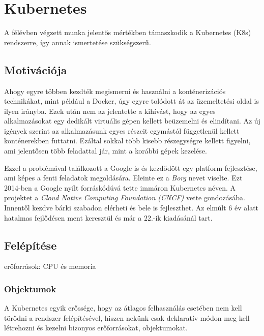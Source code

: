 \chapter{Kubernetes}
\label{sec:Kubernetes}
A félévben végzett munka jelentős mértékben támaszkodik a Kubernetes (K8s) rendszerre, így annak ismertetése szükségszerű. 

\section{Motivációja}
Ahogy egyre többen kezdték megismerni és használni a konténerizációs technikákat, mint például a Docker, úgy egyre tolódott át az üzemeltetési oldal is ilyen irányba. Ezek után nem  az jelentette a kihívást, hogy az egyes alkalmazásokat egy dedikált virtuális gépen kellett beüzemelni és elindítani. Az új igények szerint az alkalmazásunk egyes részeit egymástól függetlenül kellett konténerekben futtatni. Ezáltal sokkal több kisebb részegységre kellett figyelni, ami jelentősen több feladattal jár, mint a korábbi gépek kezelése. 

Ezzel a problémával találkozott a Google is és kezdődött egy platform fejlesztése, ami képes a fenti feladatok megoldására. Eleinte ez a \textit{Borg}\citep{Borg} nevet viselte. Ezt 2014-ben a Google nyílt forráskódúvá tette immáron Kubernetes néven. A projektet a \textit{Cloud Native Computing Foundation (CNCF)} vette gondozásába. Innentől kezdve bárki szabadon elérheti és bele is fejleszthet. Az elmúlt 6 év alatt hatalmas fejlődésen ment keresztül és már a $22$.-ik kiadásánál tart.

\section{Felépítése}
erőforrások: CPU és memoria

\subsection{Objektumok}
A Kubernetes egyik erőssége, hogy az átlagos felhasználás esetében nem kell törődni a rendszer felépítésével, hiszen nekünk csak deklaratív módon meg kell létrehozni és kezelni bizonyos erőforrásokat, objektumokat.
  

